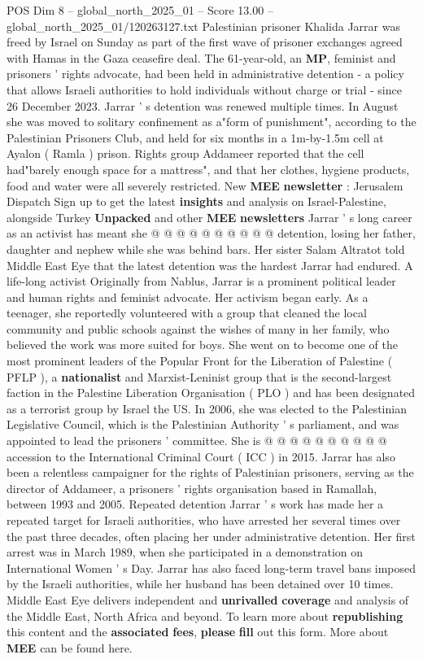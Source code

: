 \begin{textsample}{POS Dim 8 – global\_north\_2025\_01 – Score 13.00 – global\_north\_2025\_01/120263127.txt}  \label{ex:f8_pos_104}
Palestinian prisoner Khalida Jarrar was freed by Israel on Sunday as part of the first wave of prisoner exchanges agreed with Hamas in the Gaza ceasefire deal.
The 61-year-old, an \textbf{MP}, feminist and prisoners ' rights advocate, had been held in administrative detention - a policy that allows Israeli authorities to hold individuals without charge or trial - since 26 December 2023.
Jarrar ' s detention was renewed multiple times.
In August she was moved to solitary confinement as a"form of punishment", according to the Palestinian Prisoners Club, and held for six months in a 1m-by-1.5m cell at Ayalon ( Ramla ) prison.
Rights group Addameer reported that the cell had"barely enough space for a mattress", and that her clothes, hygiene products, food and water were all severely restricted.
New \textbf{MEE} \textbf{newsletter} : Jerusalem Dispatch Sign up to get the latest \textbf{insights} and analysis on Israel-Palestine, alongside Turkey \textbf{Unpacked} and other \textbf{MEE} \textbf{newsletters} Jarrar ' s long career as an activist has meant she @ @ @ @ @ @ @ @ @ @ detention, losing her father, daughter and nephew while she was behind bars.
Her sister Salam Altratot told Middle East Eye that the latest detention was the hardest Jarrar had endured.
A life-long activist Originally from Nablus, Jarrar is a prominent political leader and human rights and feminist advocate.
Her activism began early.
As a teenager, she reportedly volunteered with a group that cleaned the local community and public schools against the wishes of many in her family, who believed the work was more suited for boys.
She went on to become one of the most prominent leaders of the Popular Front for the Liberation of Palestine ( PFLP ), a \textbf{nationalist} and Marxist-Leninist group that is the second-largest faction in the Palestine Liberation Organisation ( PLO ) and has been designated as a terrorist group by Israel the US.
In 2006, she was elected to the Palestinian Legislative Council, which is the Palestinian Authority ' s parliament, and was appointed to lead the prisoners ' committee.
She is @ @ @ @ @ @ @ @ @ @ accession to the International Criminal Court ( ICC ) in 2015.
Jarrar has also been a relentless campaigner for the rights of Palestinian prisoners, serving as the director of Addameer, a prisoners ' rights organisation based in Ramallah, between 1993 and 2005.
Repeated detention Jarrar ' s work has made her a repeated target for Israeli authorities, who have arrested her several times over the past three decades, often placing her under administrative detention.
Her first arrest was in March 1989, when she participated in a demonstration on International Women ' s Day.
Jarrar has also faced long-term travel bans imposed by the Israeli authorities, while her husband has been detained over 10 times.
Middle East Eye delivers independent and \textbf{unrivalled} \textbf{coverage} and analysis of the Middle East, North Africa and beyond.
To learn more about \textbf{republishing} this content and the \textbf{associated} \textbf{fees}, \textbf{please} \textbf{fill} out this form.
More about \textbf{MEE} can be found here.


\end{textsample}
